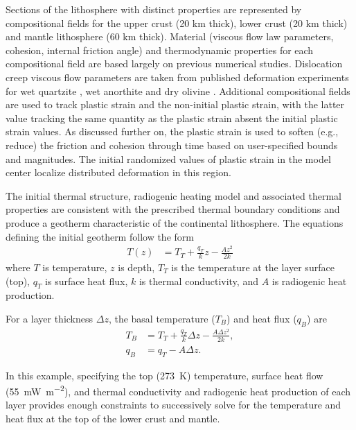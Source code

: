 

Sections of the lithosphere with distinct properties are represented by compositional fields for the upper crust (20 km thick), lower crust (20 km thick) and mantle lithosphere (60 km thick). Material (viscous flow law parameters, cohesion, internal friction angle) and thermodynamic properties for each compositional field are based largely on previous numerical studies. Dislocation creep viscous flow parameters are taken from published deformation experiments for wet quartzite \cite{RB04}, wet anorthite \cite{RGWD06} and dry olivine \cite{HK04}. Additional compositional fields are used to track plastic strain and the non-initial plastic strain, with the latter value tracking the same quantity as the plastic strain absent the initial plastic strain values. As discussed further on, the plastic strain is used to soften (e.g., reduce) the friction and cohesion through time based on user-specified bounds and magnitudes. The initial randomized values of plastic strain in the model center localize distributed deformation in this region.



The initial thermal structure, radiogenic heating model and associated thermal properties are consistent with the prescribed thermal boundary conditions and produce a geotherm characteristic of the continental lithosphere. The equations defining the initial geotherm \cite{Cha86} follow the form
\begin{align}
  \label{eq:continental-geotherm-1}
  T(z) &= T_T + \frac{q_T}{k}z - \frac{Az^2}{2k}
\end{align}
where $T$ is temperature, $z$ is depth, $T_T$ is the temperature at the layer surface (top), $q_T$ is surface heat flux, $k$ is thermal conductivity, and $A$ is radiogenic heat production.

For a layer thickness $\Delta z$, the basal temperature ($T_B$) and heat flux ($q_B$) are
\begin{align}
  \label{eq:continental-geotherm-2}
  T_B &= T_T + \frac{q_T}{k} \Delta z - \frac{A \Delta z^2}{2k},
  \\
  \label{eq:continental-geotherm-3}
  q_B &= q_T - A \Delta z.
\end{align}

In this example, specifying the top (\SI{273}{K}) temperature, surface heat flow (\SI{55}{\milli\watt\per\meter^2}), and thermal conductivity and radiogenic heat production of each layer provides enough constraints to successively solve for the temperature and heat flux at the top of the lower crust and mantle.

